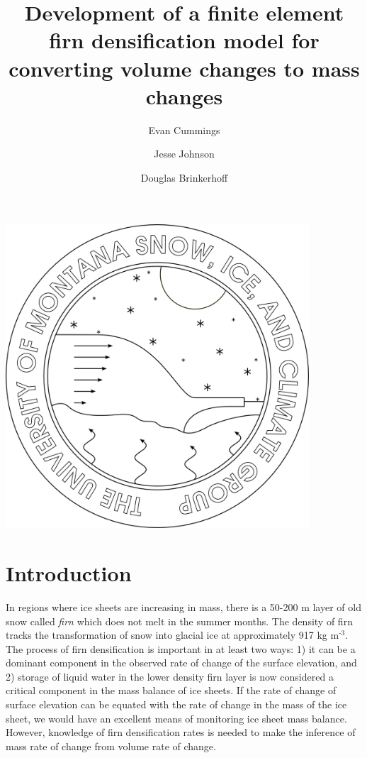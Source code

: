 \documentclass{article}%
\newcommand{\sups}[1]{\ensuremath{^{\textrm{#1}}}}
\begin{document}

\small

\title{Development of a finite element firn densification model for converting volume changes to mass changes}
\author{Evan Cummings \and Jesse Johnson \and Douglas Brinkerhoff}
\maketitle
\begin{center}
\includegraphics[width=4.455666122085252in]{images/logoPlain.png}
\end{center}

\twocolumn


\section{Introduction}


In regions where ice sheets are increasing in mass, there is a 50-200 m layer of old snow called \emph{firn} which does not melt in the summer months.  The density of firn tracks the transformation of snow into glacial ice at approximately 917 kg m\sups{-3}.  The process of firn densification is important in at least two ways: 1) it can be a dominant component in the observed rate of change of the surface elevation, and 2) storage of liquid water in the lower density firn layer is now considered a critical component in the mass balance of ice sheets.  If the rate of change of surface elevation can be equated with the rate of change in the mass of the ice sheet, we would have an excellent means of monitoring ice sheet mass balance.  However, knowledge of firn densification rates is needed to make the inference of mass rate of change from volume rate of change.
\end{document}
